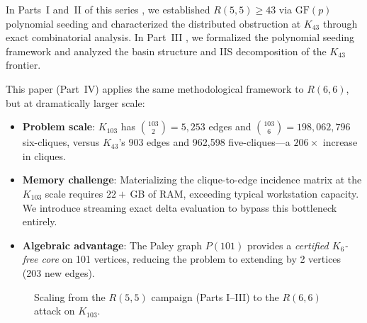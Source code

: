 \documentclass[11pt,a4paper]{article}
\theoremstyle{plain}
\theoremstyle{remark}
\newcommand{\GF}{\mathrm{GF}}
\begin{document}
In Parts~I and~II of this series \cite{daugherty2026ramsey,daugherty2026obstruction},
we established $R(5,5) \geq 43$ via $\GF(p)$ polynomial seeding and
characterized the distributed obstruction at $K_{43}$ through exact
combinatorial analysis.
In Part~III \cite{daugherty2026gfp}, we
formalized the polynomial seeding framework and analyzed the basin
structure and IIS decomposition of the $K_{43}$ frontier.

This paper (Part~IV) applies the same methodological framework to
$R(6,6)$, but at dramatically larger scale:

\begin{itemize}[leftmargin=2em]
  \item \textbf{Problem scale}: $K_{103}$ has $\binom{103}{2} = 5{,}253$ edges
    and $\binom{103}{6} = 198{,}062{,}796$ six-cliques, versus $K_{43}$'s
    903 edges and 962{,}598 five-cliques---a $206\times$ increase in cliques.
  \item \textbf{Memory challenge}: Materializing the clique-to-edge
    incidence matrix at the $K_{103}$ scale requires $22{+}$\,GB of RAM,
    exceeding typical workstation capacity. We introduce streaming exact
    delta evaluation to bypass this bottleneck entirely.
  \item \textbf{Algebraic advantage}: The Paley graph $P(101)$ provides
    a \emph{certified $K_6$-free core} on 101 vertices, reducing the
    problem to extending by 2 vertices (203 new edges).
\end{itemize}

\begin{figure}[H]
\centering
{}
\caption{Scaling from the $R(5,5)$ campaign (Parts I--III) to the
  $R(6,6)$ attack on $K_{103}$.}
\label{fig:approach}
\end{figure}
\end{document}
